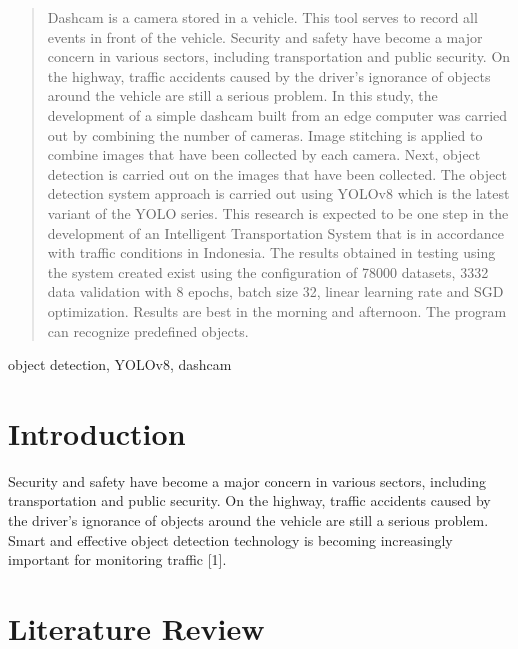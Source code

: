 \documentclass[conference]{IEEEtran}
\begin{document}
\begin{abstract}
Dashcam is a camera stored in a vehicle. This tool serves to record all events in front of the vehicle. Security and safety have become a major concern in various sectors, including transportation and public security. On the highway, traffic accidents caused by the driver's ignorance of objects around the vehicle are still a serious problem. In this study, the development of a simple dashcam built from an edge computer was carried out by combining the number of cameras. Image stitching is applied to combine images that have been collected by each camera. Next, object detection is carried out on the images that have been collected. The object detection system approach is carried out using YOLOv8 which is the latest variant of the YOLO series. This research is expected to be one step in the development of an Intelligent Transportation System that is in accordance with traffic conditions in Indonesia. The results obtained in testing using the system created exist using the configuration of 78000 datasets, 3332 data validation with 8 epochs, batch size 32, linear learning rate and SGD optimization. Results are best in the morning and afternoon. The program can recognize predefined objects. 
\end{abstract}

\begin{IEEEkeywords}
object detection, YOLOv8, dashcam
\end{IEEEkeywords}

\section{Introduction}
Security and safety have become a major concern in various sectors, including transportation and public security. On the highway, traffic accidents caused by the driver's ignorance of objects around the vehicle are still a serious problem. Smart and effective object detection technology is becoming increasingly important for monitoring traffic [1].

\section{Literature Review}
\end{document}
